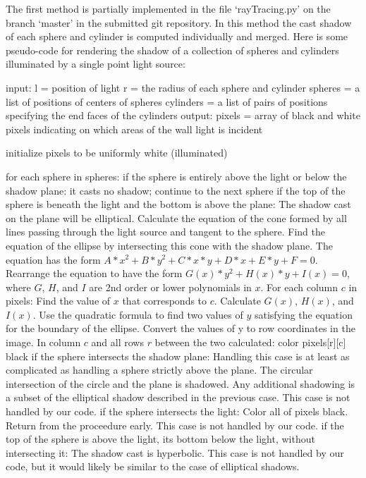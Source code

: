 \documentclass[letter,10pt]{article}
\begin{document}
The first method is partially implemented in the file `rayTracing.py' on the branch `master' in the submitted git repository. In this method the cast shadow of each sphere and cylinder is computed individually and merged. Here is some pseudo-code for rendering the shadow of a collection of spheres and cylinders illuminated by a single point light source:

input: l = position of light
	   r = the radius of each sphere and cylinder
	   spheres = a list of positions of centers of spheres
	   cylinders = a list of pairs of positions specifying the end faces of the
					cylinders
output: pixels = array of black and white pixels indicating on which areas of the
					wall light is incident

initialize pixels to be uniformly white (illuminated)

for each sphere in spheres:
	if the sphere is entirely above the light or below the shadow plane:
		it casts no shadow; continue to the next sphere
	if the top of the sphere is beneath the light and the bottom is above the plane:
		The shadow cast on the plane will be elliptical.
		Calculate the equation of the cone formed by all lines passing through the
				light source and tangent to the sphere.
		Find the equation of the ellipse by intersecting this cone with the shadow
				plane.
		The equation has the form $A*x^2 + B*y^2 + C*x*y + D*x + E*y + F = 0$.
		Rearrange the equation to have the form $G(x)*y^2 + H(x)*y + I(x) = 0$, where
				$G$, $H$, and $I$ are 2nd order or lower polynomials in $x$.
		For each column $c$ in pixels:
			Find the value of $x$ that corresponds to $c$.
			Calculate $G(x)$, $H(x)$, and $I(x)$.
			Use the quadratic formula to find two values of $y$ satisfying the
					equation for the boundary of the ellipse.
			Convert the values of y to row coordinates in the image.
			In column $c$ and all rows $r$ between the two calculated:
				color pixels[r][c] black
	if the sphere intersects the shadow plane:
		Handling this case is at least as complicated as handling a sphere strictly
				above the plane.
		The circular intersection of the circle and the plane is shadowed.
		Any additional shadowing is a subset of the elliptical shadow described in
				the previous case.
		This case is not handled by our code.
	if the sphere intersects the light:
		Color all of pixels black.
		Return from the proceedure early.
		This case is not handled by our code.
	if the top of the sphere is above the light, its bottom below the light, without
			intersecting it:
		The shadow cast is hyperbolic.
		This case is not handled by our code, but it would likely be similar to
				the case of elliptical shadows.
\end{document}
